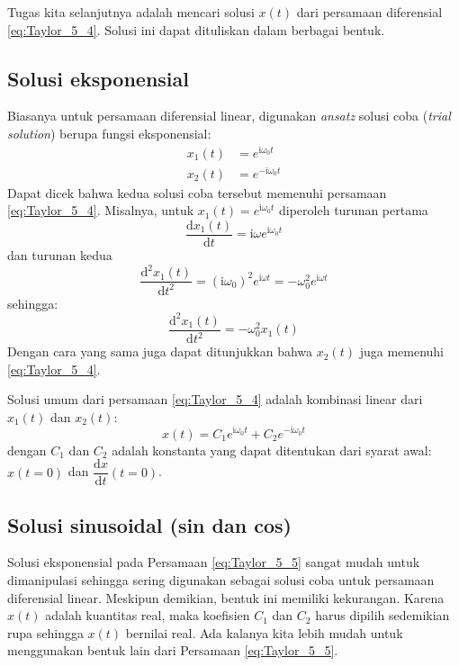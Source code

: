 Tugas kita selanjutnya adalah mencari solusi $x(t)$ dari persamaan diferensial
\eqref{eq:Taylor_5_4}. Solusi ini dapat dituliskan dalam berbagai bentuk.



\subsection*{Solusi eksponensial}

Biasanya untuk persamaan diferensial linear, digunakan \textit{ansatz} solusi
coba (\textit{trial solution}) berupa fungsi eksponensial:
\begin{align*}
x_{1}(t) & = e^{\mathrm{i}\omega_0 t} \\
x_{2}(t) & = e^{-\mathrm{i}\omega_0 t}
\end{align*}
%
Dapat dicek bahwa kedua solusi coba tersebut memenuhi persamaan \eqref{eq:Taylor_5_4}.
Misalnya, untuk $x_{1}(t) = e^{\mathrm{i}\omega_0 t}$ diperoleh turunan pertama
%
\begin{equation*}
\frac{\mathrm{d}x_{1}(t)}{\mathrm{d}t} = \mathrm{i}\omega e^{\mathrm{i} \omega_0 t}
\end{equation*}
%
dan turunan kedua
%
\begin{equation*}
\frac{\mathrm{d}^{2}x_{1}(t)}{\mathrm{d}t^{2}} = (\mathrm{i}\omega_0)^{2} e^{\mathrm{i} \omega t} =
-\omega_{0}^{2}e^{\mathrm{i} \omega t}
\end{equation*}
sehingga:
\begin{equation*}
\frac{\mathrm{d}^{2}x_1(t)}{\mathrm{d}t^{2}} = -\omega_0^{2} x_{1}(t)
\end{equation*}
Dengan cara yang sama juga dapat ditunjukkan bahwa $x_{2}(t)$ juga
memenuhi \eqref{eq:Taylor_5_4}.

Solusi umum dari persamaan \eqref{eq:Taylor_5_4} adalah kombinasi linear dari
$x_{1}(t)$ dan $x_{2}(t)$:
\begin{equation}
x(t) = C_{1} e^{\mathrm{i}\omega_{0} t} + C_{2} e^{-\mathrm{i}\omega_{0} t}
\label{eq:Taylor_5_5}
\end{equation}
dengan $C_1$ dan $C_2$ adalah konstanta yang dapat
ditentukan dari syarat awal: $x(t=0)$ dan $\dfrac{\mathrm{d}x}{\mathrm{d}t}(t=0)$.



\subsection*{Solusi sinusoidal (sin dan cos)}

Solusi eksponensial pada Persamaan \eqref{eq:Taylor_5_5} sangat mudah untuk dimanipulasi
sehingga sering digunakan sebagai solusi coba untuk persamaan diferensial linear. Meskipun
demikian, bentuk ini memiliki kekurangan. Karena $x(t)$ adalah kuantitas real, maka koefisien
$C_1$ dan $C_2$ harus dipilih sedemikian rupa sehingga $x(t)$ bernilai real. Ada kalanya
kita lebih mudah untuk menggunakan bentuk lain dari Persamaan \eqref{eq:Taylor_5_5}.

